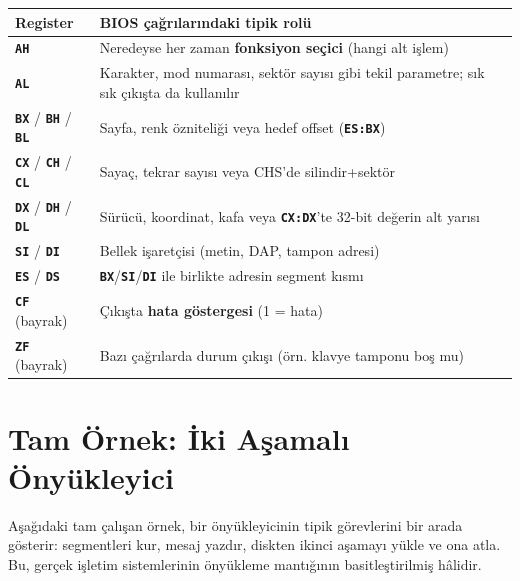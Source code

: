 \documentclass[11pt,a4paper]{article}
\newcommand{\reg}[1]{\texttt{\color{anaMavi}\textbf{#1}}}
\begin{document}
\begin{center}
\begin{tabularx}{\textwidth}{@{}l >{\raggedright\arraybackslash}X@{}}
\toprule
\rowcolor{anaMavi}\color{white}\textbf{Register} & \color{white}\textbf{BIOS çağrılarındaki tipik rolü} \\
\midrule
\reg{AH} & Neredeyse her zaman \textbf{fonksiyon seçici} (hangi alt işlem) \\
\rowcolor{acikGri} \reg{AL} & Karakter, mod numarası, sektör sayısı gibi tekil parametre; sık sık çıkışta da kullanılır \\
\reg{BX} / \reg{BH} / \reg{BL} & Sayfa, renk özniteliği veya hedef offset (\reg{ES:BX}) \\
\rowcolor{acikGri} \reg{CX} / \reg{CH} / \reg{CL} & Sayaç, tekrar sayısı veya CHS'de silindir+sektör \\
\reg{DX} / \reg{DH} / \reg{DL} & Sürücü, koordinat, kafa veya \reg{CX:DX}'te 32-bit değerin alt yarısı \\
\rowcolor{acikGri} \reg{SI} / \reg{DI} & Bellek işaretçisi (metin, DAP, tampon adresi) \\
\reg{ES} / \reg{DS} & \reg{BX}/\reg{SI}/\reg{DI} ile birlikte adresin segment kısmı \\
\rowcolor{acikGri} \reg{CF} (bayrak) & Çıkışta \textbf{hata göstergesi} (1 = hata) \\
\reg{ZF} (bayrak) & Bazı çağrılarda durum çıkışı (örn. klavye tamponu boş mu) \\
\bottomrule
\end{tabularx}
\end{center}

\section{Tam Örnek: İki Aşamalı Önyükleyici}

Aşağıdaki tam çalışan örnek, bir önyükleyicinin tipik görevlerini bir arada
gösterir: segmentleri kur, mesaj yazdır, diskten ikinci aşamayı yükle ve ona
atla. Bu, gerçek işletim sistemlerinin önyükleme mantığının basitleştirilmiş
hâlidir.
\end{document}

